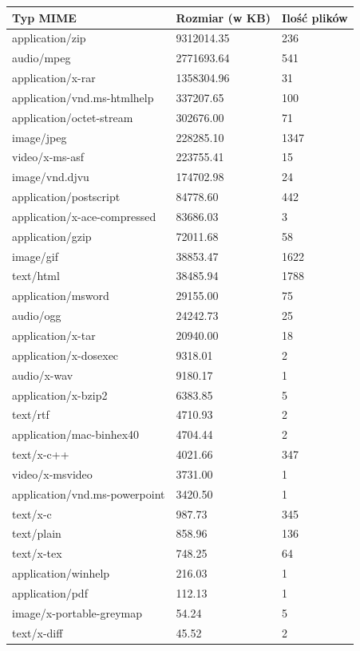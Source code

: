 \begin{table}[h]
    \centering
    \begin{tabular}{|l|l|l|}
        \hline
        \textbf{Typ MIME} & \textbf{Rozmiar (w KB)} & \textbf{Ilość plików}\\
        \hline
application/zip & 9312014.35 & 236 \\
audio/mpeg & 2771693.64 & 541 \\
application/x-rar & 1358304.96 & 31 \\
application/vnd.ms-htmlhelp & 337207.65 & 100 \\
application/octet-stream & 302676.00 & 71 \\
image/jpeg & 228285.10 & 1347 \\
video/x-ms-asf & 223755.41 & 15 \\
image/vnd.djvu & 174702.98 & 24 \\
application/postscript & 84778.60 & 442 \\
application/x-ace-compressed & 83686.03 & 3 \\
application/gzip & 72011.68 & 58 \\
image/gif & 38853.47 & 1622 \\
text/html & 38485.94 & 1788 \\
application/msword & 29155.00 & 75 \\
audio/ogg & 24242.73 & 25 \\
application/x-tar & 20940.00 & 18 \\
application/x-dosexec & 9318.01 & 2 \\
audio/x-wav & 9180.17 & 1 \\
application/x-bzip2 & 6383.85 & 5 \\
text/rtf & 4710.93 & 2 \\
application/mac-binhex40 & 4704.44 & 2 \\
text/x-c++ & 4021.66 & 347 \\
video/x-msvideo & 3731.00 & 1 \\
application/vnd.ms-powerpoint & 3420.50 & 1 \\
text/x-c & 987.73 & 345 \\
text/plain & 858.96 & 136 \\
text/x-tex & 748.25 & 64 \\
application/winhelp & 216.03 & 1 \\
application/pdf & 112.13 & 1 \\
image/x-portable-greymap & 54.24 & 5 \\
text/x-diff & 45.52 & 2 \\

\end{tabular}
\end{table}
